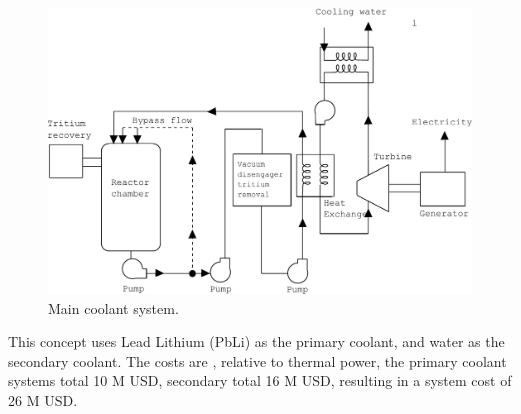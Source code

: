 \begin{figure}[h!]  
\centering  
\includegraphics[width=0.8\linewidth]{StandardFigures/steamPbLi-eps-converted-to.pdf}
\caption{Main coolant system.}
\label{fig:coola}
\end{figure} 

This concept uses Lead Lithium (PbLi) as the primary coolant, and water as the secondary coolant.  The costs are , relative to thermal power, the primary coolant systems total 10 M USD, secondary total 16 M USD, resulting in a system cost of 26 M USD. 